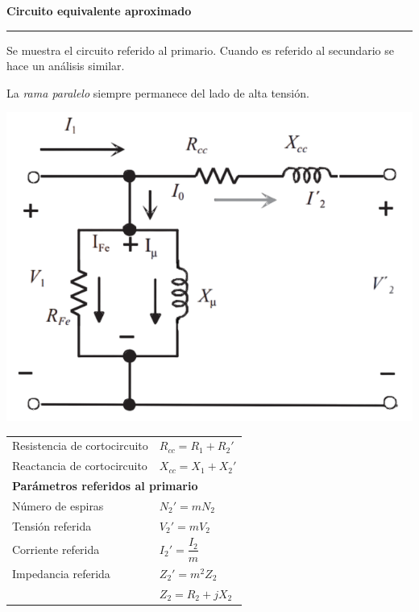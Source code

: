 \documentclass[11pt,a4paper]{article}
\newcommand{\subtitulo}[1]{
	\textbf{#1} \\ \vspace{.1cm} {\color{gray} \hrule}
}
\begin{document}
\begin{cajita}
	\subtitulo{Circuito equivalente aproximado}
	
	\begin{flushleft}
		Se muestra el circuito referido al primario. Cuando es referido al secundario se hace un análisis similar.
		
		La \textsl{rama paralelo} siempre permanece del lado de alta tensión.
	\end{flushleft}

	\begin{multicols}{2}
		\includegraphics[width=.8\linewidth]{equi-aprox} \\
		
		\begin{tabular}{l l}
			Resistencia de cortocircuito &
			$R_{cc} = R_1 + R_2'$\\ \vspace{.1cm}
			Reactancia de cortocircuito & $X_{cc} = X_1 + X_2'$ \vspace{.2cm}  \\
			\multicolumn{2}{l}{\textbf{Parámetros referidos al primario} \vspace{.1cm}} \\ \vspace{.1cm}
			Número de espiras & $N_2' = m N_2$ \\ \vspace{.1cm}
			Tensión referida & $V_2' = m V_2$ \\ \vspace{.1cm}
			Corriente referida & $I_2' = \dfrac{I_2}{m}$ \\ \vspace{.1cm}
			Impedancia referida & $Z_2' = m^2 Z_2$ \\ \vspace{.1cm}
			& $Z_2 = R_2 + j X_2$\\
		\end{tabular}
	\end{multicols}
	

\end{cajita}
\end{document}
